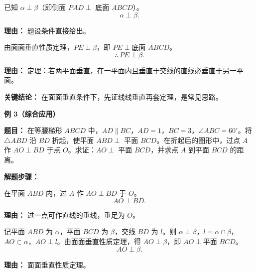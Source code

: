 \begin{examplebox}
\begin{description}[style=nextline, leftmargin=2.8em, labelsep=0.5em, itemsep=0.45em]
		\item[\textbf{第三步（确认面面垂直）：}] 已知 $\alpha\perp\beta$（即侧面 $PAD\perp$ 底面 $ABCD$）。
			\[
				\alpha\perp\beta.
			\]
			\par\textbf{理由：} 题设条件直接给出。

		\item[\textbf{第四步（应用定理）：}] 由面面垂直性质定理，$PE\perp\beta$，即 $PE\perp$底面 $ABCD$。
			\[
				\therefore\ PE\perp\beta.
			\]
			\par\textbf{理由：} 定理：若两平面垂直，在一平面内且垂直于交线的直线必垂直于另一平面。
	\end{description}

	\textbf{\textcolor{CExample}{关键结论：}}
	在面面垂直条件下，先证线线垂直再套定理，是常见思路。

	\medskip
	\textbf{\textcolor{CExample}{例 3（综合应用）}}

	\textbf{\textcolor{CExample}{题目：}}
	在等腰梯形 $ABCD$ 中，$AD\parallel BC$，$AD=1$，$BC=3$，$\angle ABC=60^\circ$。将 $\triangle ABD$ 沿 $BD$ 折起，使平面 $ABD\perp$ 平面 $BCD$。在折起后的图形中，过点 $A$ 作 $AO\perp BD$ 于点 $O$。求证：$AO\perp$ 平面 $BCD$，并求点 $A$ 到平面 $BCD$ 的距离。

	\textbf{\textcolor{CExample}{解题步骤：}}
	\begin{description}[style=nextline, leftmargin=2.8em, labelsep=0.5em, itemsep=0.45em]
		\item[\textbf{第一步（作辅助垂线）：}] 在平面 $ABD$ 内，过 $A$ 作 $AO\perp BD$ 于 $O$。
			\[
				AO\perp BD.
			\]
			\par\textbf{理由：} 过一点可作直线的垂线，垂足为 $O$。

		\item[\textbf{第二步（应用定理得线面垂直）：}] 记平面 $ABD$ 为 $\alpha$，平面 $BCD$ 为 $\beta$，交线 $BD$ 为 $l$。则 $\alpha\perp\beta$，$l=\alpha\cap\beta$，$AO\subset\alpha$，$AO\perp l$。由面面垂直性质定理，得 $AO\perp\beta$，即 $AO\perp$平面 $BCD$。
			\[
				AO\perp\beta.
			\]
			\par\textbf{理由：} 面面垂直性质定理。


\end{description}
\end{examplebox}
